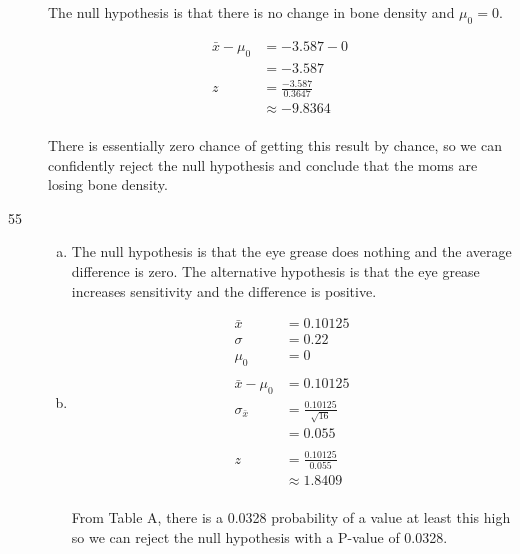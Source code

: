 \documentclass[letterpaper]{exam}
\begin{document}
\begin{description}
        The null hypothesis is that there is no change in bone density and
        $\mu_0 = 0$.

        \begin{align*}
          \bar{x} - \mu_0 & = -3.587 - 0 \\
                          & = -3.587 \\
          z & = \frac{-3.587}{0.3647} \\
            & \approx -9.8364 \\
        \end{align*}

        There is essentially zero chance of getting this result by chance,
        so we can confidently reject the null hypothesis and conclude that
        the moms are losing bone density.

      \item[55]
        \begin{enumerate}[(a)]
          \item The null hypothesis is that the eye grease does nothing and the
            average difference is zero. The alternative hypothesis is that the
            eye grease increases sensitivity and the difference is positive.

          \item
            \begin{align*}
              \bar{x} & = 0.10125 \\
              \sigma  & = 0.22 \\
              \mu_0   & = 0 \\
              \\
              \bar{x} - \mu_0  & = 0.10125 \\
              \sigma_{\bar{x}} & = \frac{0.10125}{\sqrt{16}} \\
                               & = 0.055 \\
              \\
              z & = \frac{0.10125}{0.055} \\
                & \approx 1.8409 \\
            \end{align*}

            From Table A, there is a 0.0328 probability of a value at least this
            high so we can reject the null hypothesis with a P-value of 0.0328.

        \end{enumerate}


\end{description}
\end{document}
